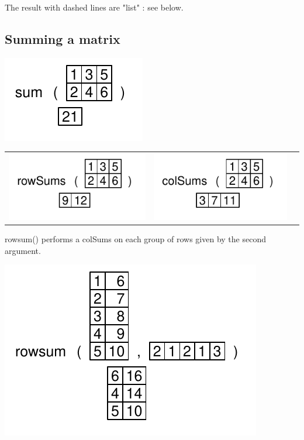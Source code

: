 \documentclass[pdflatex]{article}
\begin{document}
The result with dashed lines are "list" : see below.

\subsection{Summing a matrix}

\includegraphics{matrix_sum} 

\begin{tabular}{ccc}
\includegraphics{rowSums} & \includegraphics{colSums}
\end{tabular}

rowsum() performs a colSums on each group of rows given by the second argument.

\includegraphics{rowsum} 
\end{document}
